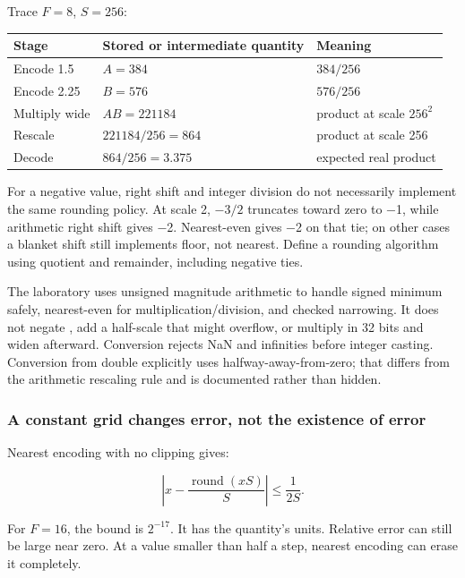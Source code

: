 Trace \(F=8\), \(S=256\):

{\def\LTcaptype{none} %
\begin{longtable}[]{@{}lll@{}}
\toprule\noalign{}
Stage & Stored or intermediate quantity & Meaning \\
\midrule\noalign{}
\endhead
\bottomrule\noalign{}
\endlastfoot
Encode 1.5 & \(A=384\) & \(384/256\) \\
Encode 2.25 & \(B=576\) & \(576/256\) \\
Multiply wide & \(AB=221184\) & product at scale \(256^2\) \\
Rescale & \(221184/256=864\) & product at scale 256 \\
Decode & \(864/256=3.375\) & expected real product \\
\end{longtable}
}

For a negative value, right shift and integer division do not necessarily implement the same rounding policy. At scale 2, \(-3/2\) truncates toward zero to −1, while arithmetic right shift gives −2. Nearest-even gives −2 on that tie; on other cases a blanket shift still implements floor, not nearest. Define a rounding algorithm using quotient and remainder, including negative ties.

The laboratory uses unsigned magnitude arithmetic to handle signed minimum safely, nearest-even for multiplication/division, and checked narrowing. It does not negate , add a half-scale that might overflow, or multiply in 32 bits and widen afterward. Conversion rejects NaN and infinities before integer casting. Conversion from double explicitly uses halfway-away-from-zero; that differs from the arithmetic rescaling rule and is documented rather than hidden.

\subsubsection{A constant grid changes error, not the existence of error}\label{01-foundations-i-ch001-a-constant-grid-changes-error-not-the-existence-of-error}

\hypertarget{01-foundations-i-ch001-a-constant-grid-changes-error-not-the-existence-of-error}{}

Nearest encoding with no clipping gives:

\[
\left|x-\frac{\operatorname{round}(xS)}{S}\right|\le\frac{1}{2S}.
\]

For \(F=16\), the bound is \(2^{-17}\). It has the quantity's units. Relative error can still be large near zero. At a value smaller than half a step, nearest encoding can erase it completely.

